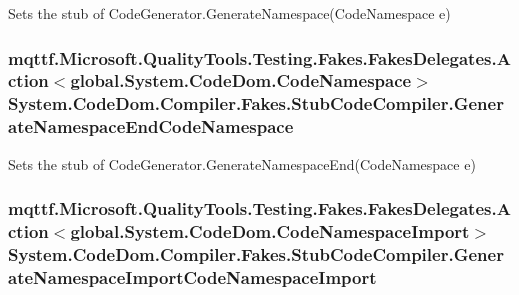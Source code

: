 Sets the stub of Code\-Generator.\-Generate\-Namespace(\-Code\-Namespace e)

\hypertarget{class_system_1_1_code_dom_1_1_compiler_1_1_fakes_1_1_stub_code_compiler_a9a1812073cb4c4a8ab2fe137254e89fa}{
\subsubsection[{Generate\-Namespace\-End\-Code\-Namespace}]{\setlength{\rightskip}{0pt plus 5cm}mqttf.\-Microsoft.\-Quality\-Tools.\-Testing.\-Fakes.\-Fakes\-Delegates.\-Action$<$global.\-System.\-Code\-Dom.\-Code\-Namespace$>$ System.\-Code\-Dom.\-Compiler.\-Fakes.\-Stub\-Code\-Compiler.\-Generate\-Namespace\-End\-Code\-Namespace}}\label{class_system_1_1_code_dom_1_1_compiler_1_1_fakes_1_1_stub_code_compiler_a9a1812073cb4c4a8ab2fe137254e89fa}


Sets the stub of Code\-Generator.\-Generate\-Namespace\-End(\-Code\-Namespace e)

\hypertarget{class_system_1_1_code_dom_1_1_compiler_1_1_fakes_1_1_stub_code_compiler_a72bdef68ce4280c0c23af4fa847bd607}{
\subsubsection[{Generate\-Namespace\-Import\-Code\-Namespace\-Import}]{\setlength{\rightskip}{0pt plus 5cm}mqttf.\-Microsoft.\-Quality\-Tools.\-Testing.\-Fakes.\-Fakes\-Delegates.\-Action$<$global.\-System.\-Code\-Dom.\-Code\-Namespace\-Import$>$ System.\-Code\-Dom.\-Compiler.\-Fakes.\-Stub\-Code\-Compiler.\-Generate\-Namespace\-Import\-Code\-Namespace\-Import}}\label{class_system_1_1_code_dom_1_1_compiler_1_1_fakes_1_1_stub_code_compiler_a72bdef68ce4280c0c23af4fa847bd607}


